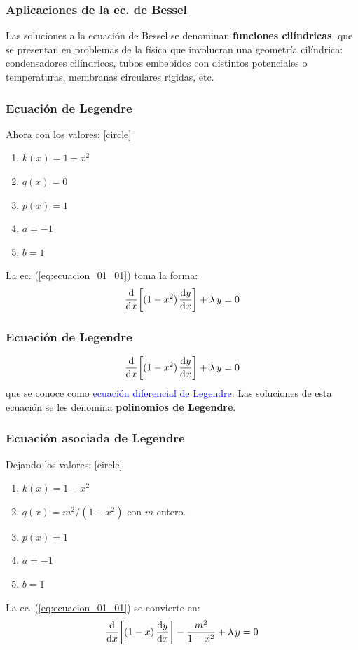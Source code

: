 \documentclass[12pt]{beamer}
\begin{document}
\begin{frame}
\frametitle{Aplicaciones de la ec. de Bessel}
Las soluciones a la ecuación de Bessel se denominan \textbf{funciones cilíndricas}, que se presentan en problemas de la física que involucran una geometría cilíndrica: condensadores cilíndricos, tubos embebidos con distintos potenciales o temperaturas, membranas circulares rígidas, etc.
\end{frame}
\begin{frame}
\frametitle{Ecuación de Legendre}
Ahora con los valores:
[circle]
\begin{enumerate}[<+->]
\item $k(x) = 1 - x^{2}$
\item $q(x) = 0$
\item $p(x) = 1$
\item $a = -1$
\item $b = 1$
\end{enumerate}
\pause
La ec. (\ref{eq:ecuacion_01_01}) toma la forma:
\begin{align}
\dv{x} \bigg[ (1 - x^{2}) \, \dv{y}{x} \bigg] + \lambda \, y = 0
\label{eq:ecuacion_01_05}
\end{align}
\end{frame}
\begin{frame}
\frametitle{Ecuación de Legendre}
\begin{align*}
\dv{x} \bigg[ (1 - x^{2}) \, \dv{y}{x} \bigg] + \lambda \, y = 0
\end{align*}
\pause
que se conoce como \textcolor{blue}{ecuación diferencial de Legendre}. \pause Las soluciones de esta ecuación se les denomina \textbf{polinomios de Legendre}.
\end{frame}
\begin{frame}
\frametitle{Ecuación asociada de Legendre}
Dejando los valores:
[circle]
\begin{enumerate}[<+->]
\item $k(x) = 1 - x^{2}$
\item $q(x) = m^{2}/(1 - x^{2})$ con $m$ entero.
\item $p(x) = 1$
\item $a = -1$
\item $b = 1$
\end{enumerate}
\pause
La ec. (\ref{eq:ecuacion_01_01}) se convierte en:
\begin{align}
\dv{x} \bigg[ (1 - x) \, \dv{y}{x} \bigg] - \dfrac{m^{2}}{1 - x^{2}} + \lambda \, y = 0
\label{eq:ecuacion_01_06}
\end{align}
\end{frame}
\end{document}
